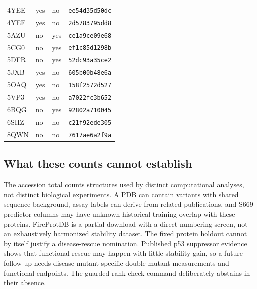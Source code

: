 \documentclass[11pt]{article}
\begin{document}
\begin{longtable}{llll}
4YEE & yes & no & \texttt{ee54d35d50dc}\\
4YEF & yes & no & \texttt{2d5783795dd8}\\
5AZU & no & yes & \texttt{ce1a9ce09e68}\\
5CG0 & no & yes & \texttt{ef1c85d1298b}\\
5DFR & no & yes & \texttt{52dc93a35ce2}\\
5JXB & yes & no & \texttt{605b00b48e6a}\\
5OAQ & yes & no & \texttt{158f2572d527}\\
5VP3 & yes & no & \texttt{a7022fc3b652}\\
6BQG & no & yes & \texttt{92802a710045}\\
6SHZ & no & no & \texttt{c21f92ede305}\\
8QWN & no & no & \texttt{7617ae6a2f9a}\\
\hline\end{longtable}
\subsection{What these counts cannot establish}
The accession total counts structures used by distinct computational analyses, not distinct biological experiments. A PDB can contain variants with shared sequence background, assay labels can derive from related publications, and S669 predictor columns may have unknown historical training overlap with these proteins. FireProtDB is a partial download with a direct-numbering screen, not an exhaustively harmonized stability dataset. The fixed protein holdout cannot by itself justify a disease-rescue nomination. Published p53 suppressor evidence shows that functional rescue may happen with little stability gain, so a future follow-up needs disease-mutant-specific double-mutant measurements and functional endpoints. The guarded rank-check command deliberately abstains in their absence.
\end{document}
